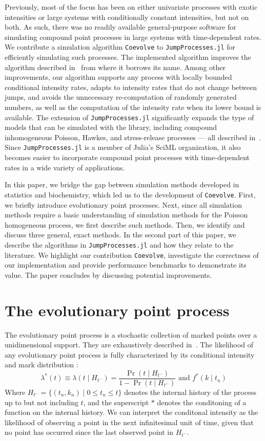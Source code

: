 \documentclass{juliacon}
\begin{document}
Previously, most of the focus has been on either univariate processes with exotic intensities or large systems with conditionally constant intensities, but not on both. As such, there was no readily available general-purpose software for simulating compound point processes in large systems with time-dependent rates. We contribute a simulation algorithm \texttt{Coevolve} to \texttt{JumpProcesses.jl} for efficiently simulating such processes. The implemented algorithm improves the algorithm described in~\cite{farajtabar2017} from where it borrows its name. Among other improvements, our algorithm supports any process with locally bounded conditional intensity rates, adapts to intensity rates that do not change between jumps, and avoids the unnecessary re-computation of randomly generated numbers, as well as the computation of the intensity rate when its lower bound is available. The extension of \texttt{JumpProcesses.jl} significantly expands the type of models that can be simulated with the library, including compound inhomogeneous Poisson, Hawkes, and stress-release processes --- all described in~\cite{daley2003}. Since \texttt{JumpProcesses.jl} is a member of Julia's SciML organization, it also becomes easier to incorporate compound point processes with time-dependent rates in a wide variety of applications.

In this paper, we bridge the gap between simulation methods developed in statistics and biochemistry, which led us to the development of \texttt{Coevolve}. First, we briefly introduce evolutionary point processes. Next, since all simulation methods require a basic understanding of simulation methods for the Poisson homogeneous process, we first describe such methods. Then, we identify and discuss three general, exact methods. In the second part of this paper, we describe the algorithms in \texttt{JumpProcesses.jl} and how they relate to the literature. We highlight our contribution \texttt{Coevolve}, investigate the correctness of our implementation and provide performance benchmarks to demonstrate its value. The paper concludes by discussing potential improvements.

\section{The evolutionary point process} \label{sec:notation}

The evolutionary point process is a stochastic collection of marked points over a unidimensional support. They are exhaustively described in~\cite{daley2003}. The likelihood of any evolutionary point process is fully characterized by its conditional intensity and mark distribution :
\[ 
  \lambda^\ast (t) \equiv \lambda(t \mid H_{t^-} ) = \frac{\Pr(t \mid H_{t^-})}{1 - \Pr(t \mid H_{t^-})} \text{ and } f^\ast(k \mid t_n)
\]
Where \( H_{t^-} = \{ (t_n, k_n) \mid 0 \leq t_n \leq t \} \) denotes the internal history of the process up to but not including \( t \), and the superscript \( \ast \) denotes the conditoning of a function on the internal history. We can interpret the conditonal intensity as the likelihood of observing a point in the next infinitesimal unit of time, given that no point has occurred since the last observed point in \( H_{t^-} \).
\end{document}
